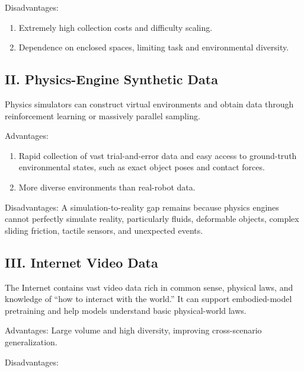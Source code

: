 Disadvantages:

\begin{enumerate}
\def\labelenumi{\arabic{enumi}.}
\item
  Extremely high collection costs and difficulty scaling.
\item
  Dependence on enclosed spaces, limiting task and environmental diversity.
\end{enumerate}

\hypertarget{ii.-physics-engine-synthetic-data}{%
\subsection{II. Physics-Engine Synthetic Data}\label{ii.-physics-engine-synthetic-data}}

Physics simulators can construct virtual environments and obtain data through reinforcement learning or massively parallel sampling.

Advantages:

\begin{enumerate}
\def\labelenumi{\arabic{enumi}.}
\item
  Rapid collection of vast trial-and-error data and easy access to ground-truth environmental states, such as exact object poses and contact forces.
\item
  More diverse environments than real-robot data.
\end{enumerate}

Disadvantages: A simulation-to-reality gap remains because physics engines cannot perfectly simulate reality, particularly fluids, deformable objects, complex sliding friction, tactile sensors, and unexpected events.

\hypertarget{iii.-internet-video-data}{%
\subsection{III. Internet Video Data}\label{iii.-internet-video-data}}

The Internet contains vast video data rich in common sense, physical laws, and knowledge of ``how to interact with the world.'' It can support embodied-model pretraining and help models understand basic physical-world laws.

Advantages: Large volume and high diversity, improving cross-scenario generalization.

Disadvantages:

